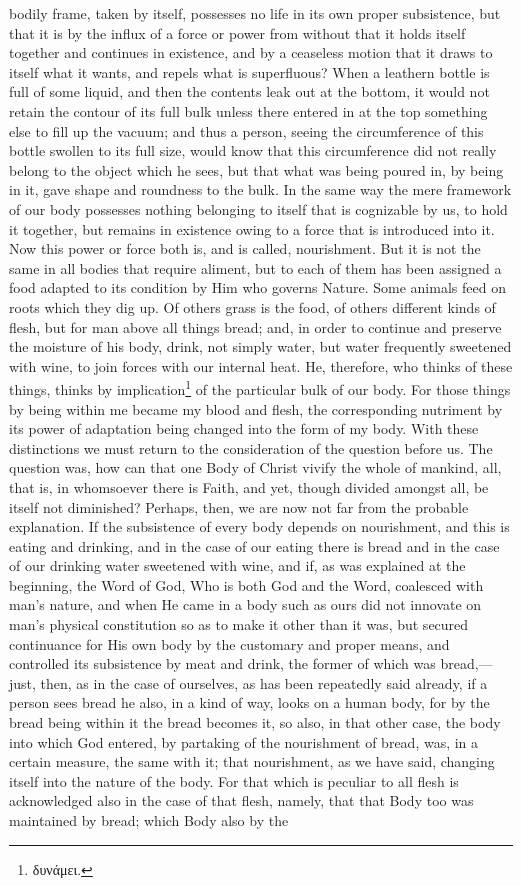 bodily frame, taken by itself, possesses no life in its own proper subsistence, but that it is by the influx of a force or power from without that it holds itself together and continues in existence, and by a ceaseless motion that it draws to itself what it wants, and repels what is superfluous? When a leathern bottle is full of some liquid, and then the contents leak out at the bottom, it would not retain the contour of its full bulk unless there entered in at the top something else to fill up the vacuum; and thus a person, seeing the circumference of this bottle swollen to its full size, would know that this circumference did not really belong to the object which he sees, but that what was being poured in, by being in it, gave shape and roundness to the bulk. In the same way the mere framework of our body possesses nothing belonging to itself that is cognizable by us, to hold it together, but remains in existence owing to a force that is introduced into it. Now this power or force both is, and is called, nourishment. But it is not the same in all bodies that require aliment, but to each of them has been assigned a food adapted to its condition by Him who governs Nature. Some animals feed on roots which they dig up. Of others grass is the food, of others different kinds of flesh, but for man above all things bread; and, in order to continue and preserve the moisture of his body, drink, not simply water, but water frequently sweetened with wine, to join forces with our internal heat. He, therefore, who thinks of these things, thinks by implication\footnote{\textgreek{δυνάμει}.} of the particular bulk of our body. For those things by being within me became my blood and flesh, the corresponding nutriment by its power of adaptation being changed into the form of my body. With these distinctions we must return to the consideration of the question before us. The question was, how can that one Body of Christ vivify the whole of mankind, all, that is, in whomsoever there is Faith, and yet, though divided amongst all, be itself not diminished? Perhaps, then, we are now not far from the probable explanation. If the subsistence of every body depends on nourishment, and this is eating and drinking, and in the case of our eating there is bread and in the case of our drinking water sweetened with wine, and if, as was explained at the beginning, the Word of God, Who is both God and the Word, coalesced with man’s nature, and when He came in a body such as ours did not innovate on man’s physical constitution so as to make it other than it was, but secured continuance for His own body by the customary and proper means, and controlled its subsistence by meat and drink, the former of which was bread,—just, then, as in the case of ourselves, as has been repeatedly said already, if a person sees bread he also, in a kind of way, looks on a human body, for by the bread being within it the bread becomes it, so also, in that other case, the body into which God entered, by partaking of the nourishment of bread, was, in a certain measure, the same with it; that nourishment, as we have said, changing itself into the nature of the body. For that which is peculiar to all flesh is acknowledged also in the case of that flesh, namely, that that Body too was maintained by bread; which Body also by the 